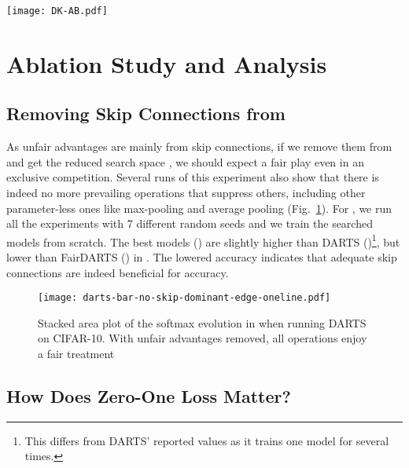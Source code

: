 \documentclass[runningheads]{llncs}
\begin{document}
\begin{figure*}[ht]
	\centering
	\texttt{[image: DK-AB.pdf]}
	\caption{The Architecture of Fair DARTS-D (top) and C (bottom). IBE\_K refers to an inverted bottleneck without an inset skip connection, while MBE\_K is the one with it. BOTTLE\_K3 is the inverted bottleneck without expansion}
	\label{fig:fair-darts-arch}
\end{figure*}








\section{Ablation Study and Analysis}


\subsection{Removing Skip Connections from }
As unfair advantages are mainly from skip connections, if we remove them from  and get the reduced search space , we should expect a fair play even in an exclusive competition. Several runs of this experiment also show that there is indeed no more prevailing operations that suppress others, including other parameter-less ones like max-pooling and average pooling (Fig.~\ref{fig:darts-bar-no-skip-dominant-edge}). For , we run all the experiments with 7 different random seeds and we train the searched models from scratch. The best models () are slightly higher than  DARTS ()\footnote{This differs from DARTS' reported values as it trains one model for several times.}, but lower than FairDARTS () in  . The lowered accuracy indicates that adequate  skip connections are indeed beneficial for accuracy.
\begin{figure}[ht]
	\centering
	\texttt{[image: darts-bar-no-skip-dominant-edge-oneline.pdf]}
\caption{Stacked area plot of the softmax evolution in   when running DARTS on CIFAR-10. With unfair advantages removed, all operations enjoy a fair treatment}
	\label{fig:darts-bar-no-skip-dominant-edge}
\end{figure}

\subsection{How Does Zero-One Loss Matter?}\label{sec:zero-one-loss}
\end{document}
